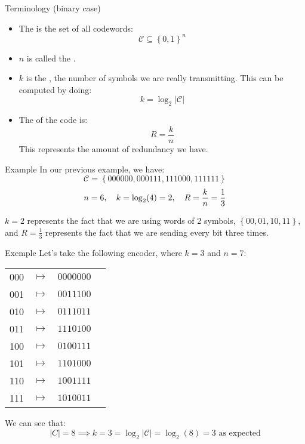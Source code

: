 \documentclass[a4paper]{article}
\begin{document}
\begin{parag}{Terminology (binary case)}
    \begin{itemize}[left=0pt]
        \item The  is the set of all codewords: 
        \[\mathcal{C} \subseteq \left\{0, 1\right\}^n\]
        \item $n$ is called the .
        \item $k$ is the , the number of symbols we are really transmitting. This can be computed by doing:
        \[k = \log_2 \left|\mathcal{C}\right|\]
        \item The  of the code is: 
        \[R = \frac{k}{n}\]
        This represents the amount of redundancy we have.
    \end{itemize}
    
    \begin{subparag}{Example}
        In our previous example, we have: 
        \[\mathcal{C} = \left\{000000, 000111, 111000, 111111\right\}\] 
        \[n = 6, \mathspace k = \log_2\left(4\right) = 2, \mathspace R = \frac{k}{n} = \frac{1}{3}\]

        $k = 2$ represents the fact that we are using words of 2 symbols, $\left\{00, 01, 10, 11\right\}$, and $R = \frac{1}{3}$ represents the fact that we are sending every bit three times.
    \end{subparag}
\end{parag}

\begin{parag}{Exemple}
    Let's take the following encoder, where $k = 3$ and $n = 7$: 
    \begin{center}
    \begin{tabular}{cccc}
        000 & $\mapsto$ & $0000000$ \\
        001 & $\mapsto$ & $0011100$ \\
        010 & $\mapsto$ & $0111011$ \\
        011 & $\mapsto$ & $1110100$ \\
        100 & $\mapsto$ & $0100111$ \\
        101 & $\mapsto$ & $1101000$ \\
        110 & $\mapsto$ & $1001111$ \\
        111 & $\mapsto$ & $1010011$ 
    \end{tabular}
    \end{center}
    
    We can see that:
    \[\left|C\right| = 8 \implies k = 3 = \log_2 \left|\mathcal{C}\right| = \log_2\left(8\right) = 3 \text{ as expected}\]
\end{parag}
\end{document}
